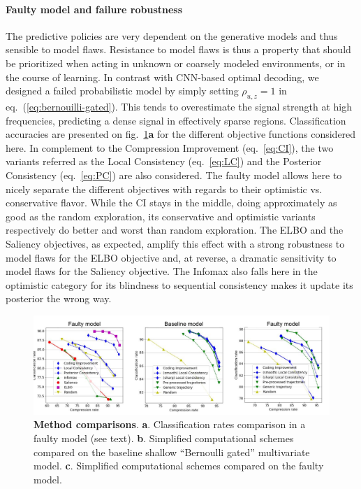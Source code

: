 \documentclass{article}
\begin{document}
\paragraph{Faulty model and failure robustness}
The predictive policies are very dependent on the generative models and thus sensible to model flaws. Resistance to model flaws is thus a property that should be prioritized when acting in unknown or coarsely modeled environments, or in the course of learning. In contrast with CNN-based optimal decoding, we designed a failed probabilistic model by simply setting $\rho_{u,z} = 1$ in eq.~(\ref{eq:bernouilli-gated}).  This tends to overestimate the signal strength at high frequencies, predicting a dense signal in effectively sparse regions. Classification accuracies are presented on fig.~\ref{fig:failed}\textbf{a} for the different objective functions considered here. In complement to the Compression Improvement (eq.~\ref{eq:CI}), the two variants referred as the Local Consistency (eq.~\ref{eq:LC}) and the Posterior Consistency (eq.~\ref{eq:PC}) are also considered. The faulty model allows here to nicely separate the different objectives with regards to their optimistic vs. conservative flavor. While the CI stays in the middle, doing approximately as good as the random exploration, its conservative and optimistic variants respectively do better and worst than random exploration. The ELBO and the Saliency objectives, as expected, amplify this effect with a strong robustness to model flaws for the ELBO objective and, at reverse, a dramatic sensitivity  to model flaws for the 	Saliency objective. The Infomax also falls here in the optimistic category for its blindness to sequential consistency makes it update its posterior the wrong way.

\begin{figure}
	\centerline{
		\includegraphics[width = \linewidth]{img/NIPS-faulty.pdf} 
	}
	\vspace{-.2cm}
	\caption{\textbf{Method comparisons}. \textbf{a}. Classification rates comparison in a faulty model (see text). \textbf{b}. Simplified computational schemes compared on the baseline shallow ``Bernoulli gated'' multivariate model. \textbf{c}. Simplified computational schemes compared on the faulty model.}\label{fig:failed}
\end{figure}
\end{document}
